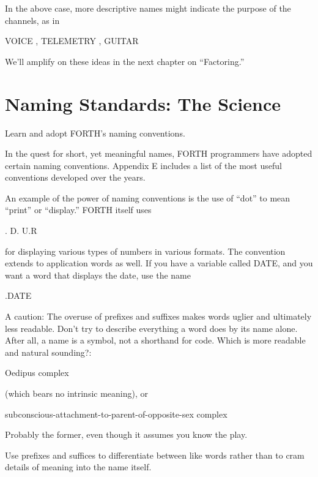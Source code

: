 In the above case, more descriptive names might indicate the purpose of
the channels, as in
\begin{Code}
VOICE  , TELEMETRY  , GUITAR
\end{Code}

We'll amplify on these ideas in the next chapter on ``Factoring.''

\section{Naming Standards: The Science}

\begin{tip}
Learn and adopt FORTH's naming conventions.
\end{tip}
In the quest for short, yet meaningful names, FORTH programmers
have adopted certain naming conventions.  Appendix E includes a list of
the most useful conventions developed over the years.

An example of the power of naming conventions is the use of ``dot''
to mean ``print'' or ``display.'' FORTH itself uses
\begin{Code}
.  D.  U.R
\end{Code}
for displaying various types of numbers in various formats.  The convention
extends to application words as well.  If you have a variable called
DATE, and you want a word that displays the date, use the name
\begin{Code}
.DATE
\end{Code}
A caution: The overuse of prefixes and suffixes makes words uglier and
ultimately less readable.  Don't try to describe everything a word does by
its name alone.  After all, a name is a symbol, not a shorthand for code.
Which is more readable and natural sounding?:
\begin{tfquot}
Oedipus complex
\end{tfquot}
(which bears no intrinsic meaning), or
\begin{tfquot}
subconscious-attachment-to-parent-of-opposite-sex complex
\end{tfquot}
Probably the former, even though it assumes you know the play.

\begin{tip}
Use prefixes and suffices to differentiate between like words rather than to
cram details of meaning into the name itself.
\end{tip}

